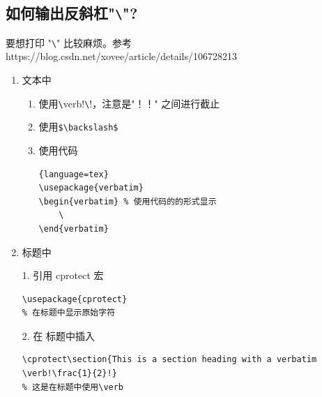 \documentclass[UTF8]{ctexart}
\begin{document}
\cprotect\subsection{如何输出反斜杠"\verb!\!"?}
要想打印 "\verb!\!" 比较麻烦。参考 https://blog.csdn.net/xovee/article/details/106728213
\begin{enumerate}
    \item 文本中

          \begin{enumerate}
              \item 使用\verb!\!verb!\verb!\!!，注意是"！！" 之间进行截止
              \item 使用\verb!$\backslash$!
              \item 使用代码
                    \begin{lstlisting}{language=tex}
\usepackage{verbatim}
\begin{verbatim} % 使用代码的的形式显示
    \
\end{verbatim}
                    \end{lstlisting}
          \end{enumerate}

    \item 标题中

          1. 引用 cprotect 宏
          \begin{lstlisting}
\usepackage{cprotect}
% 在标题中显示原始字符
            \end{lstlisting}

          2. 在 标题中插入
          \begin{lstlisting}
\cprotect\section{This is a section heading with a verbatim \verb!\frac{1}{2}!}
% 这是在标题中使用\verb
          \end{lstlisting}

\end{enumerate}
\end{document}
